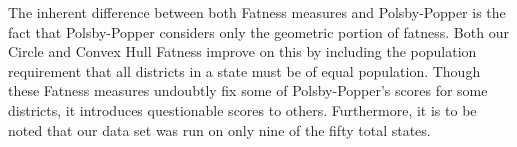 \documentclass[letterpaper]{article}
\begin{document}
The inherent difference between both Fatness measures and Polsby-Popper is the fact that Polsby-Popper considers only the geometric portion of fatness. Both our Circle and Convex Hull Fatness improve on this by including the population requirement that all districts in a state must be of equal population. Though these Fatness measures undoubtly fix some of Polsby-Popper's scores for some districts, it introduces questionable scores to others. Furthermore, it is to be noted that our data set was run on only nine of the fifty total states.

\printbibliography
\end{document}
